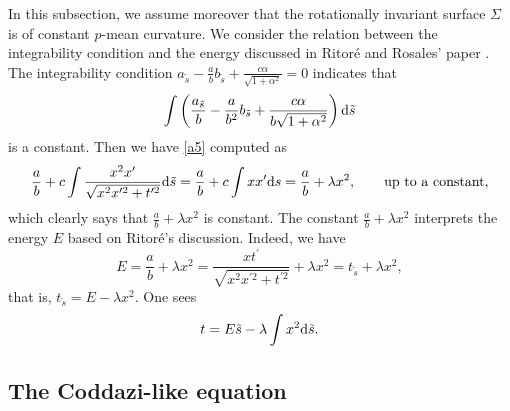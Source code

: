 \documentclass[pdftex]{sigma}
\numberwithin{equation}{section}
\begin{document}
In this subsection, we assume moreover that the rotationally invariant surface $\Sigma$ is of constant $p$-mean curvature. We consider the relation between the integrability condition and the
energy discussed in Ritor\'e and Rosales' paper \cite{Ritore/Rosales:2006}. The integrability condition
$
a_{\tilde s}-\frac{a}{b}b_{\tilde s}+\frac{c\alpha}{\sqrt{1+\alpha^2}}=0
$
indicates that
\begin{equation} \label{a5}
\int \left(\frac{a_{\tilde s}}{b}-\frac{a}{b^2}b_{\tilde s}+\frac{c\alpha}{b\sqrt{
1+\alpha^2}}\right){\rm d}\tilde s
\end{equation}
is a constant. Then we have \eqref{a5} computed as
\begin{equation*}
\frac{a}{b}+c\int \frac{x^2x^{\prime }}{\sqrt{x^2x^{\prime 2}+t^{\prime 2}}}
{\rm d}\tilde s
=\frac{a}{b}+c\int xx^{\prime }{\rm d}s
=\frac{a}{b}+\lambda x^2, \qquad\textrm{up to a constant},
\end{equation*}
which clearly says that $\frac{a}{b}+\lambda x^2$ is constant.
The constant $\frac{a}{b}+\lambda x^2$ interprets the energy $E$ based on
Ritor\'e's discussion. Indeed, we have
\begin{equation} \label{ffe}
E=\frac{a}{b}+\lambda x^2 =\frac{xt^{\prime }}{\sqrt{x^2x^{\prime 2}+t^{\prime 2}}}+\lambda x^2 =t_{\tilde s}+\lambda x^2,
\end{equation}
that is, $t_{\tilde s}=E-\lambda x^2$. One sees
\begin{equation} \label{function_t}
t=E\tilde s-\lambda \int x^2{\rm d}\tilde s.
\end{equation}

\subsection{The Coddazi-like equation}
\end{document}
